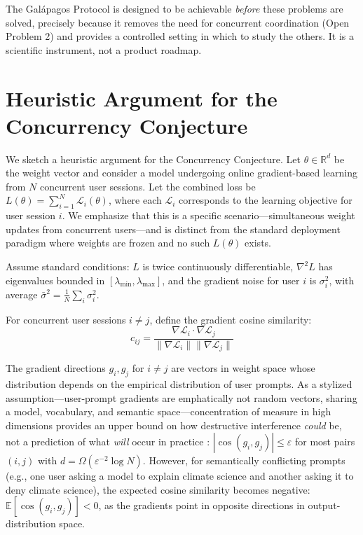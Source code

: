 \documentclass{article}
\begin{document}
The Galápagos Protocol is designed to be achievable \emph{before} these problems are solved, precisely because it removes the need for concurrent coordination (Open Problem 2) and provides a controlled setting in which to study the others. It is a scientific instrument, not a product roadmap.


\section{Heuristic Argument for the Concurrency Conjecture}
\label{app:heuristic}

We sketch a heuristic argument for the Concurrency Conjecture. Let $\theta \in \mathbb{R}^d$ be the weight vector and consider a model undergoing online gradient-based learning from $N$ concurrent user sessions. Let the combined loss be $L(\theta) = \sum_{i=1}^N \mathcal{L}_i(\theta)$, where each $\mathcal{L}_i$ corresponds to the learning objective for user session $i$. We emphasize that this is a specific scenario---simultaneous weight updates from concurrent users---and is distinct from the standard deployment paradigm where weights are frozen and no such $L(\theta)$ exists.

Assume standard conditions: $L$ is twice continuously differentiable, $\nabla^2 L$ has eigenvalues bounded in $[\lambda_{\min}, \lambda_{\max}]$, and the gradient noise for user $i$ is $\sigma_i^2$, with average $\bar{\sigma}^2 = \frac{1}{N}\sum_i \sigma_i^2$.

For concurrent user sessions $i \neq j$, define the gradient cosine similarity:
\begin{equation}
c_{ij} = \frac{\nabla \mathcal{L}_i \cdot \nabla \mathcal{L}_j}{\|\nabla \mathcal{L}_i\| \|\nabla \mathcal{L}_j\|}
\end{equation}

The gradient directions $g_i, g_j$ for $i \neq j$ are vectors in weight space whose distribution depends on the empirical distribution of user prompts. As a stylized assumption---user-prompt gradients are emphatically not random vectors, sharing a model, vocabulary, and semantic space---concentration of measure in high dimensions provides an upper bound on how destructive interference \emph{could} be, not a prediction of what \emph{will} occur in practice \citep{Ledoux2001concentration,Vershynin2018highdim}: $|\cos(g_i, g_j)| \leq \varepsilon$ for most pairs $(i,j)$ with $d = \Omega(\varepsilon^{-2} \log N)$. However, for semantically conflicting prompts (e.g., one user asking a model to explain climate science and another asking it to deny climate science), the expected cosine similarity becomes negative: $\mathbb{E}[\cos(g_i, g_j)] < 0$, as the gradients point in opposite directions in output-distribution space.
\end{document}

